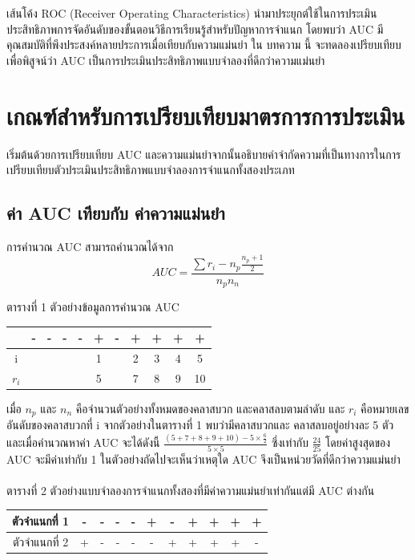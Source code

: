 \documentclass[twoside, twocolumn, 12pt]{article}
\begin{document}
เส้นโค้ง ROC (Receiver Operating Characteristics) นำมาประยุกต์ใช้ในการประเมินประสิทธิภาพการจัดอันดับของขั้นตอนวิธีการเรียนรู้สำหรับปัญหาการจำแนก \cite{2,3} โดยพบว่า AUC มีคุณสมบัติที่พึงประสงค์หลายประการเมื่อเทียบกับความแม่นยำ \cite{4}
ใน บทความ นี้ จะทดลองเปรียบเทียบเพื่อพิสูจน์ว่า AUC เป็นการประเมินประสิทธิภาพแบบจำลองที่ดีกว่าความแม่นยำ

\section{เกณฑ์สำหรับการเปรียบเทียบมาตรการการประเมิน}
\quad เริ่มต้นด้วยการเปรียบเทียบ AUC และความแม่นยำจากนั้นอธิบายคำจำกัดความที่เป็นทางการในการเปรียบเทียบตัวประเมินประสิทธิภาพแบบจำลองการจำแนกทั้งสองประเภท
\subsection{ค่า AUC เทียบกับ ค่าความแม่นยำ}
\quad การคำนวณ AUC สามารถคำนวณได้จาก\cite{5}
\begin{equation}
AUC = \frac{\sum r_i-n_p\frac{n_p + 1}{2}}{n_pn_n}
\end{equation}
\begin{center} ตารางที่ 1 ตัวอย่างข้อมูลการคำนวณ AUC \end{center}
\begin{center}
\begin{tabular}{ccccccccccc}
  &-&-&-&-&+&-&+&+&+&+ \\
  \hline
  i&&&&&1&&2&3&4&5 \\
  $r_i$& & & & & 5&&7&8&9&10\\
  \hline  
\end{tabular}
\end{center}

เมื่อ $n_p$ และ $n_n$ คือจำนวนตัวอย่างทั้งหมดของคลาสบวก และคลาสลบตามลำดับ และ $r_i$ คือหมายเลขอันดับของคลาสบวกที่ i จากตัวอย่างในตารางที่ 1 พบว่ามีคลาสบวกและ คลาสลบอยู่อย่างละ 5 ตัว และเมื่อคำนวณหาค่า AUC จะได้ดังนี้ $\frac{(5+7+8+9+10)- 5\times\frac{6}{2}}{5\times5}$ ซึ่งเท่ากับ $\frac{24}{25}$ โดยค่าสูงสุดของ AUC จะมีค่าเท่ากับ 1 ในตัวอย่างถัดไปจะเห็นว่าเหตุใด AUC จึงเป็นหน่วยวัดที่ดีกว่าความแม่นยำ\\\\
ตารางที่ 2 ตัวอย่างแบบจำลองการจำแนกทั้งสองที่มีค่าความแม่นยำเท่ากันแต่มี AUC ต่างกัน
\begin{center}
\begin{tabular}{|c|ccccc|ccccc|}
  \hline
  ตัวจำแนกที่ 1 &-& -& -& -& +& -& +& +& +& +\\
  \hline
  ตัวจำแนกที่ 2 & +& -& -& -& -& +& +& +& +& -\\
  \hline  
\end{tabular}
\end{center}
\end{document}
